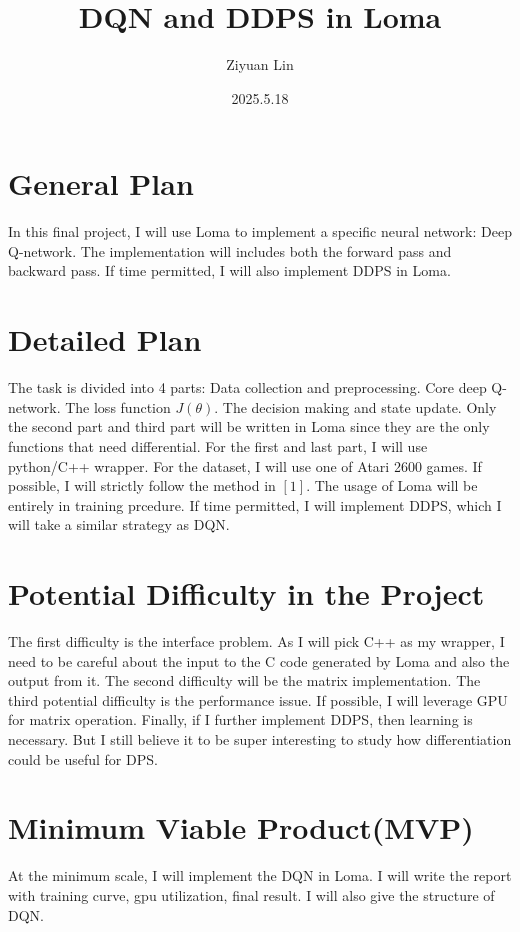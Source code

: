 \documentclass{article}
\title{DQN and DDPS in Loma}
\author{Ziyuan Lin}
\date{2025.5.18}
\begin{document}
\maketitle
\section{General Plan}
In this final project, I will use Loma to implement a specific neural network: Deep Q-network. The implementation will includes both the forward pass
and backward pass. If time permitted, I will also implement DDPS in Loma.
\section{Detailed Plan}
The task is divided into 4 parts: Data collection and preprocessing. Core deep Q-network. The loss function $J(\theta)$. The decision making and state update.
Only the second part and third part will be written in Loma since they are the only functions that need differential. For the first and last part, I will use python/C++
wrapper. For the dataset, I will use one of Atari 2600 games. If possible, I will strictly follow the method in $[1]$. The usage of Loma will be entirely in training prcedure.
If time permitted, I will implement DDPS, which I will take a similar strategy as DQN.
\section{Potential Difficulty in the Project}
The first difficulty is the interface problem. As I will pick C++ as my wrapper, I need to be careful about the input to the C code generated by Loma and also the output from it.
The second difficulty will be the matrix implementation. The third potential difficulty is the performance issue. If possible, I will leverage GPU for matrix operation. Finally, if
I further implement DDPS, then learning is necessary. But I still believe it to be super interesting to study how differentiation could be useful for DPS.
\section{Minimum Viable Product(MVP)}
At the minimum scale, I will implement the DQN in Loma. I will write the report with training curve, gpu utilization, final result. I will also give the structure of DQN.
\end{document}
